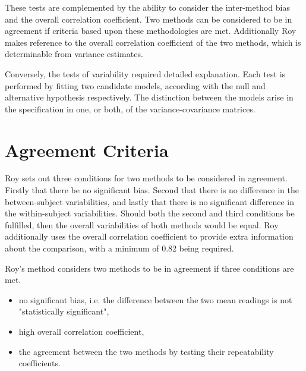 \documentclass[12pt, a4paper]{report}
\theoremstyle{plain}
\theoremstyle{definition}
\theoremstyle{remark}
\begin{document}
These tests are complemented by the ability to consider the inter-method bias and the overall correlation coefficient.
Two methods can be considered to be in agreement if criteria based upon these methodologies are met. Additionally Roy makes reference to the overall correlation coefficient of the two methods, which is determinable from variance estimates.

Conversely, the tests of variability required detailed explanation. Each test is performed by fitting two candidate models, according with the null and alternative hypothesis respectively. The distinction between the models arise in the specification in one, or both, of the variance-covariance matrices. %





\section{Agreement Criteria}	

Roy sets out three conditions for two methods to be considered in agreement. Firstly that there be no significant bias. Second that there is no difference in the between-subject variabilities, and lastly that there is no significant difference in the within-subject variabilities. Should both the second and third conditions be fulfilled, then the overall variabilities of both methods would be equal. Roy additionally uses the overall correlation coefficient to provide extra information about the comparison, with a minimum of 0.82 being required.


Roy's method considers two methods to be in agreement if three
conditions are met.

\begin{itemize}
	\item no significant bias, i.e. the difference between the two
	mean readings is not "statistically significant",
	
	\item high overall correlation coefficient,
	
	\item the agreement between the two methods by testing their
	repeatability coefficients.
	
\end{itemize}
\end{document}
